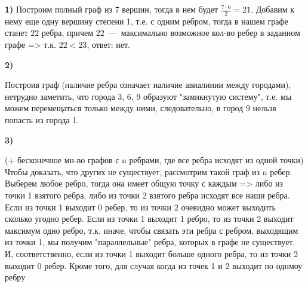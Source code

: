 \documentclass[12pt,a4paper,fleqn]{article}
\begin{document}
{\bf 1)} Построим полный граф из 7 вершин, тогда в нем будет $\frac{7\cdot6}{2} = 21$. Добавим к нему еще одну вершину степени 1, т.е. с одним ребром, тогда в нашем графе станет $22$ ребра, причем $22$~---~максимально возможное кол-во ребер в заданном графе => т.к. $22<23$, ответ: нет. \newline

{\bf 2)} \newline
{} \newline
Построив граф (наличие ребра означает наличие авиалинии между городами), нетрудно заметить, что города 3, 6, 9 образуют "замнкнутую систему", т.е. мы можем перемещаться только между ними, следовательно, в город 9 нельзя попасть из города 1. \newline

{\bf 3)} \newline
{} \newline
(+ бесконечное мн-во графов с n ребрами, где все ребра исходят из одной точки)\newline
Чтобы доказать, что других не существует, рассмотрим такой граф из n ребер. Выберем любое ребро, тогда она имеет общую точку с каждым => либо из точки 1 взятого ребра, либо из точки 2 взятого ребра исходят все наши ребра. Если из точки 1 выходит 0 ребер, то из точки 2 очевидно может выходить сколько угодно ребер. Если из точки 1 выходит 1 ребро, то из точки 2 выходит максимум одно ребро, т.к. иначе, чтобы связать эти ребра с ребром, выходящим из точки 1, мы получим "параллельные" ребра, которых в графе не существует. И, соответственно, если из точки 1 выходит больше одного ребра, то из точки 2 выходит 0 ребер. Кроме того, для случая когда из точек 1 и 2 выходит по однмоу ребру \newline
\end{document}

